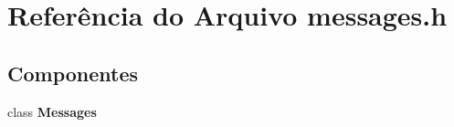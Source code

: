 \section{Referência do Arquivo messages.\+h}
\label{messages_8h}
\subsection*{Componentes}
\begin{DoxyCompactItemize}
\item 
class {\bf Messages}
\end{DoxyCompactItemize}
